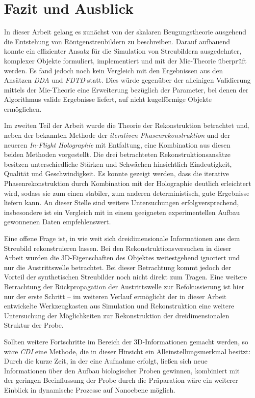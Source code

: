 \chapter{Fazit und Ausblick}
In dieser Arbeit gelang es zunächst von der skalaren Beugungstheorie ausgehend die Entstehung von Röntgenstreubildern zu beschreiben. Darauf aufbauend konnte ein effizienter Ansatz für die Simulation von Streubildern ausgedehnter, komplexer Objekte formuliert, implementiert und mit der Mie-Theorie überprüft werden. Es fand jedoch noch kein Vergleich mit den Ergebnissen aus den Ansätzen \textit{DDA} und \textit{FDTD} statt. Dies würde gegenüber der alleinigen Validierung mittels der Mie-Theorie eine Erweiterung bezüglich der Parameter, bei denen der Algorithmus valide Ergebnisse liefert, auf nicht kugelförmige Objekte ermöglichen. 

Im zweiten Teil der Arbeit wurde die Theorie der Rekonstruktion betrachtet und, neben der bekannten Methode der \textit{iterativen Phasenrekonstruktion} und der neueren \textit{In-Flight Holographie} mit Entfaltung, eine Kombination aus diesen beiden Methoden vorgestellt. Die drei betrachteten Rekonstruktionsansätze besitzen unterschiedliche Stärken und Schwächen hinsichtlich Eindeutigkeit, Qualität und Geschwindigkeit. Es konnte gezeigt werden, dass die iterative Phasenrekonstruktion durch Kombination mit der Holographie deutlich erleichtert wird, sodass sie zum einen stabiler, zum anderen deterministisch, gute Ergebnisse liefern kann. An dieser Stelle sind weitere Untersuchungen erfolgversprechend, insbesondere ist ein Vergleich mit in einem geeigneten experimentellen Aufbau gewonnenen Daten empfehlenswert.

Eine offene Frage ist, in wie weit sich dreidimensionale Informationen aus dem Streubild rekonstruieren lassen. Bei den Rekonstruktionsversuchen in dieser Arbeit wurden die 3D-Eigenschaften des Objektes weitestgehend ignoriert und nur die Austrittswelle betrachtet. Bei dieser Betrachtung kommt jedoch der Vorteil der synthetischen Streubilder noch nicht direkt zum Tragen. Eine weitere Betrachtung der Rückpropagation der Austrittswelle zur Refokussierung ist hier nur der erste Schritt -- im weiteren Verlauf ermöglicht der in dieser Arbeit entwickelte Werkzeugkasten aus Simulation und Rekonstruktion eine weitere Untersuchung der Möglichkeiten zur Rekonstruktion der dreidimensionalen Struktur der Probe. 

Sollten weitere Fortschritte im Bereich der 3D-Informationen gemacht werden, so wäre \textit{CDI} eine Methode, die in dieser Hinsicht ein Alleinstellungsmerkmal besitzt: Durch die kurze Zeit, in der eine Aufnahme erfolgt, ließen sich neue Informationen über den Aufbau biologischer Proben gewinnen, kombiniert mit der geringen Beeinflussung der Probe durch die Präparation wäre ein weiterer Einblick in dynamische Prozesse auf Nanoebene möglich. 